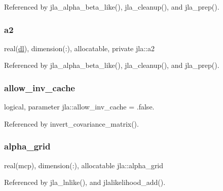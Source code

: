 Referenced by jla\+\_\+alpha\+\_\+beta\+\_\+like(), jla\+\_\+cleanup(), and jla\+\_\+prep().

\mbox{\label{namespacejla_a4745bbeba0b176717566b37123f5a538}} 
\subsubsection{\texorpdfstring{a2}{a2}}
{\footnotesize\ttfamily real(\mbox{\hyperlink{namespacejla_a3aa6435b4e08f1d532390186ac608741}{dl}}), dimension(\+:), allocatable, private jla\+::a2\hspace{0.3cm}{\ttfamily [private]}}



Referenced by jla\+\_\+alpha\+\_\+beta\+\_\+like(), jla\+\_\+cleanup(), and jla\+\_\+prep().

\mbox{\label{namespacejla_a5032684691d0e984e5aa1cbdc55795f7}} 
\subsubsection{\texorpdfstring{allow\+\_\+inv\+\_\+cache}{allow\_inv\_cache}}
{\footnotesize\ttfamily logical, parameter jla\+::allow\+\_\+inv\+\_\+cache = .false.}



Referenced by invert\+\_\+covariance\+\_\+matrix().

\mbox{\label{namespacejla_a1b7511f05dabf960a434da4444f44b88}} 
\subsubsection{\texorpdfstring{alpha\+\_\+grid}{alpha\_grid}}
{\footnotesize\ttfamily real(mcp), dimension(\+:), allocatable jla\+::alpha\+\_\+grid}



Referenced by jla\+\_\+lnlike(), and jlalikelihood\+\_\+add().

\mbox{\label{namespacejla_ade47fc5cee67934ebf1deb3f971e55ba}} 
